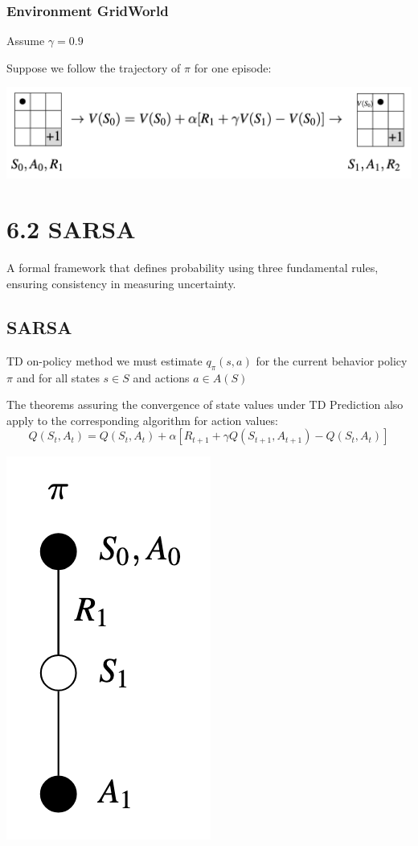 \documentclass[
  letterpaper,
  DIV=11,
  numbers=noendperiod]{scrreprt}
\begin{document}
\subsection{Environment GridWorld}\label{environment-gridworld-5}

Assume \(\gamma = 0.9\)

Suppose we follow the trajectory of \(\pi\) for one episode:

\begin{center}
\includegraphics[width=0.65\linewidth,height=\textheight,keepaspectratio]{lecture6/images/GridWorldTD-Prediction.png}
\end{center}

\chapter{6.2 SARSA}\label{sarsa}

\begin{tcolorbox}[enhanced jigsaw, arc=.35mm, toprule=.15mm, leftrule=.75mm, colback=white, left=2mm, colframe=quarto-callout-note-color-frame, rightrule=.15mm, opacityback=0, breakable, bottomrule=.15mm]

A formal framework that defines probability using three fundamental
rules, ensuring consistency in measuring uncertainty. 🎲

\end{tcolorbox}

\section{SARSA}\label{sarsa-1}

TD on-policy method we must estimate \(q_{\pi}(s, a)\) for the current
behavior policy \(\pi\) and for all states \(s \in S\) and actions
\(a \in A(S)\)

The theorems assuring the convergence of state values under TD
Prediction also apply to the corresponding algorithm for action values:
\[
Q(S_{t},A_{t}) = Q(S_{t},A_{t}) + \alpha [ R_{t+1} + \gamma Q(S_{t+1},A_{t+1}) - Q(S_{t},A_{t})]
\]

\begin{center}
\includegraphics[width=0.11\linewidth,height=\textheight,keepaspectratio]{lecture6/images/SARSA.png}
\end{center}
\end{document}
